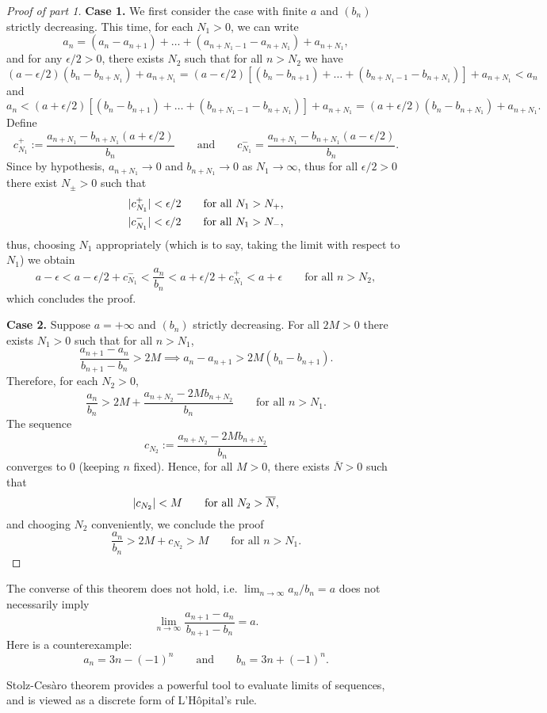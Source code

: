 \begin{proof}[Proof of part 1]
  \phantom{.}

  \textbf{Case 1.} We first consider the case with finite $a$ and
  $(b_n)$ strictly decreasing. This time, for each $N_1 > 0$, we can write
  \[ a_n = (a_n - a_{n + 1}) + \dots + (a_{n + N_1 - 1} - a_{n +
  N_1}) + a_{n + N_1}, \]
  and for any $\epsilon / 2 > 0$, there exists $N_2$ such that for
  all $n > N_2$ we have
  \[ (a - \epsilon / 2) (b_n - b_{n + N_1}) + a_{n + N_1} = (a -
    \epsilon / 2) [(b_n - b_{n + 1}) + \dots + (b_{n + N_1 - 1} -
  b_{n + N_1})] + a_{n + N_1} < a_n \]
  and
  \[ a_n < (a + \epsilon / 2) [(b_n - b_{n + 1}) + \dots + (b_{n +
    N_1 - 1} - b_{n + N_1})] + a_{n + N_1} = (a + \epsilon / 2) (b_n -
  b_{n + N_1}) + a_{n + N_1}. \]
  Define
  \[ c_{N_1}^+ := \frac{a_{n + N_1} - b_{n + N_1} (a + \epsilon /
    2)}{b_n} \qquad \text{and} \qquad c_{N_1}^- = \frac{a_{n + N_1} -
  b_{n + N_1} (a - \epsilon / 2)}{b_n}. \]
  Since by hypothesis, $a_{n + N_1} \to 0$ and $b_{n + N_1} \to 0$ as
  $N_1 \to \infty$, thus for all $\epsilon / 2 > 0$ there exist
  $N_{\pm} > 0$ such that
  \begin{align*}
    | c_{N_1}^+ | < \epsilon / 2 \qquad \text{for all $N_1 > N_+$}, \\
    | c_{N_1}^- | < \epsilon / 2 \qquad \text{for all $N_1 > N_-$},
  \end{align*}
  thus, choosing $N_1$ appropriately (which is to say, taking the
  limit with respect to $N_1$) we obtain
  \[ a - \epsilon < a - \epsilon / 2 + c_{N_1}^- < \frac{a_n}{b_n} <
    a + \epsilon / 2 + c_{N_1}^+ < a + \epsilon \qquad \text{for all $n
  > N_2$}, \]
  which concludes the proof.

  \textbf{Case 2.} Suppose $a = +\infty$ and $(b_n)$ strictly
  decreasing. For all $2M > 0$ there exists $N_1 > 0$ such that for
  all $n > N_1$,
  \[ \frac{a_{n + 1} - a_n}{b_{n + 1} - b_n} > 2M \implies a_n - a_{n
  + 1} > 2M (b_n - b_{n + 1}). \]
  Therefore, for each $N_2 > 0$,
  \[ \frac{a_n}{b_n} > 2M + \frac{a_{n + N_2} - 2M b_{n + N_2}}{b_n}
  \qquad \text{for all $n > N_1$}. \]
  The sequence
  \[ c_{N_2} := \frac{a_{n + N_2} - 2M b_{n + N_2}}{b_n} \]
  converges to 0 (keeping $n$ fixed). Hence, for all $M > 0$, there
  exists $\overline{N} > 0$ such that
  \[ | c_{N_2} | < M \qquad \text{for all $N_2 > \overline{N}$}, \]
  and chooging $N_2$ conveniently, we conclude the proof
  \[ \frac{a_n}{b_n} > 2M + c_{N_2} > M \qquad \text{for all $n > N_1$}. \]
\end{proof}

\begin{remark}
  The converse of this theorem does not hold, i.e. $\lim_{n \to
  \infty} a_n / b_n = a$ does not necessarily imply
  \[ \lim_{n \to \infty} \frac{a_{n + 1} - a_n}{b_{n + 1} - b_n} = a. \]
  Here is a counterexample:
  \[ a_n = 3n - (-1)^n \qquad \text{and} \qquad b_n = 3n + (-1)^n. \]
\end{remark}

\begin{remark}
  Stolz-Cesàro theorem provides a powerful tool to evaluate limits of
  sequences, and is
  viewed as a discrete form of L'Hôpital's rule.
\end{remark}
